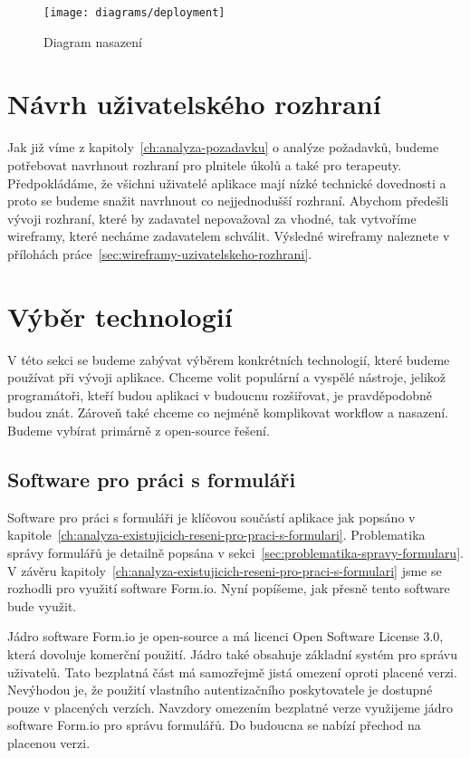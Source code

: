 \begin{figure}[H]
    \centering
    \texttt{[image: diagrams/deployment]}
    \caption{Diagram nasazení}\label{fig:deployment}
\end{figure}


\section{Návrh uživatelského rozhraní}\label{sec:navrh-uzivatelskeho-rozhrani}

Jak již víme z kapitoly~\ref{ch:analyza-pozadavku} o analýze požadavků, budeme potřebovat navrhnout rozhraní pro plnitele úkolů a také pro terapeuty.
Předpokládáme, že všichni uživatelé aplikace mají nízké technické dovednosti a proto se budeme snažit navrhnout co nejjednodušší rozhraní.
Abychom předešli vývoji rozhraní, které by zadavatel nepovažoval za vhodné, tak vytvoříme wireframy, které necháme zadavatelem schválit.
Výsledné wireframy naleznete v přílohách práce~\ref{sec:wireframy-uzivatelskeho-rozhrani}.


\section{Výběr technologií}\label{sec:vyber-technologii}

V této sekci se budeme zabývat výběrem konkrétních technologií, které budeme používat při vývoji aplikace.
Chceme volit populární a vyspělé nástroje, jelikož programátoři, kteří budou aplikaci v budoucnu rozšiřovat, je pravděpodobně budou znát.
Zároveň také chceme co nejméně komplikovat workflow a nasazení.
Budeme vybírat primárně z open-source řešení.

\subsection{Software pro práci s formuláři}\label{subsec:software-pro-praci-s-formulari}

Software pro práci s formuláři je klíčovou součástí aplikace jak popsáno v kapitole~\ref{ch:analyza-existujicich-reseni-pro-praci-s-formulari}.
Problematika správy formulářů je detailně popsána v sekci~\ref{sec:problematika-spravy-formularu}.
V závěru kapitoly~\ref{ch:analyza-existujicich-reseni-pro-praci-s-formulari} jsme se rozhodli pro využití software Form.io.
Nyní popíšeme, jak přesně tento software bude využit.

Jádro software Form.io je open-source a má licenci Open Software License 3.0, která dovoluje komerční použití.
Jádro také obsahuje základní systém pro správu uživatelů.
Tato bezplatná část má samozřejmě jistá omezení oproti placené verzi.
Nevýhodou je, že použití vlastního autentizačního poskytovatele je dostupné pouze v placených verzích.
Navzdory omezením bezplatné verze využijeme jádro software Form.io pro správu formulářů.
Do budoucna se nabízí přechod na placenou verzi.

